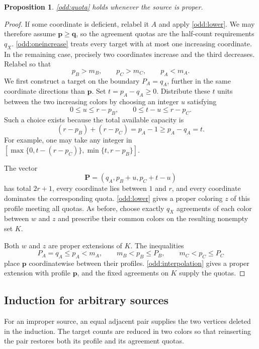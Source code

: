 \documentclass[11pt,reqno]{amsart}
\numberwithin{equation}{section}
\newtheorem{proposition}[theorem]{Proposition}
\theoremstyle{definition}
\theoremstyle{remark}
\begin{document}
\begin{proposition}\label{odd:proper}
\cref{odd:quota} holds whenever the source is proper.
\end{proposition}
\begin{proof}
If some coordinate is deficient, relabel it $A$ and apply
\cref{odd:lower}. We may therefore assume $\mathbf p\ge\mathbf q$,
so the agreement quotas are the half-count requirements $q_X$.
\cref{odd:oneincrease} treats every target with at most one
increasing coordinate. In the remaining case, precisely two
coordinates increase and the third decreases. Relabel so that
\[
p_B>m_B,\qquad p_C>m_C,\qquad p_A<m_A.
\]
We first construct a target on the boundary $P_A=q_A$, further in
the same coordinate directions than $\mathbf p$.
Set $t=p_A-q_A\ge0$. Distribute these $t$ units between the two
increasing colors by choosing an integer $u$ satisfying
\[
0\le u\le r-p_B,\qquad 0\le t-u\le r-p_C.
\]
Such a choice exists because the total available capacity is
\[
(r-p_B)+(r-p_C)=p_A-1\ge p_A-q_A=t.
\]
For example, one may take any integer in
$[\max\{0,t-(r-p_C)\},\min\{t,r-p_B\}]$.

The vector
\[
\mathbf P=(q_A,p_B+u,p_C+t-u)
\]
has total $2r+1$, every coordinate lies between $1$ and $r$, and
every coordinate dominates the corresponding quota.
\cref{odd:lower} gives a proper coloring $z$ of this profile
meeting all quotas. As before, choose exactly $q_X$ agreements of
each color between $w$ and $z$ and prescribe their common colors
on the resulting nonempty set $K$.

Both $w$ and $z$ are proper extensions of $K$. The inequalities
\[
P_A=q_A\le p_A<m_A,
\qquad m_B<p_B\le P_B,
\qquad m_C<p_C\le P_C
\]
place $\mathbf p$ coordinatewise between their profiles.
\cref{odd:interpolation} gives a proper extension with profile
$\mathbf p$, and the fixed agreements on $K$ supply the quotas.
\end{proof}

\subsection{Induction for arbitrary sources}

For an improper source, an equal adjacent pair supplies the two
vertices deleted in the induction. The target counts are reduced in
two colors so that reinserting the pair restores both its profile and
its agreement quotas.
\end{document}
